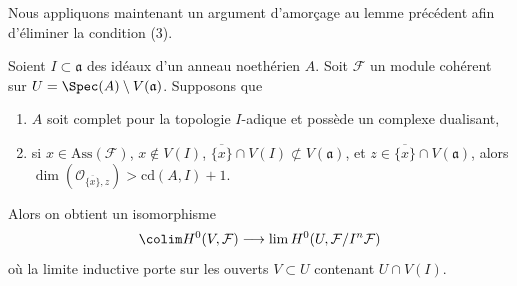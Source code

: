 \noindent
Nous appliquons maintenant un argument d'amorçage au lemme précédent afin d'éliminer la condition (3).

\begin{proposition}
\label{proposition-application-H0}
Soient $I \subset \mathfrak a$ des idéaux d'un anneau noethérien $A$.
Soit $\mathcal{F}$ un module cohérent sur
$U = \Spec(A) \setminus V(\mathfrak a)$.
Supposons que
\begin{enumerate}
\item $A$ soit complet pour la topologie $I$-adique et possède un complexe dualisant,
\item si $x \in \text{Ass}(\mathcal{F})$, $x \not \in V(I)$,
$\overline{\{x\}} \cap V(I) \not \subset V(\mathfrak a)$,
et $z \in \overline{\{x\}} \cap V(\mathfrak a)$, alors
$\dim(\mathcal{O}_{\overline{\{x\}}, z}) > \text{cd}(A, I) + 1$.
\end{enumerate}
Alors on obtient un isomorphisme
$$
\colim H^0(V, \mathcal{F})
\longrightarrow
\lim H^0(U, \mathcal{F}/I^n\mathcal{F})
$$
où la limite inductive porte sur les ouverts $V \subset U$ contenant $U \cap V(I)$.
\end{proposition}

